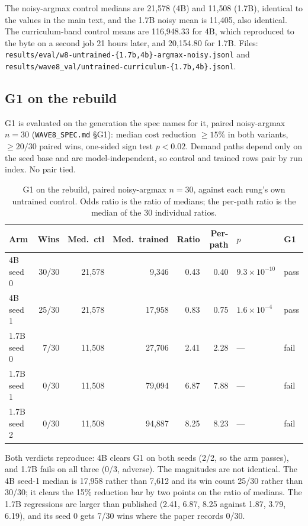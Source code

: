 \documentclass[11pt,a4paper]{article}
\begin{document}
The noisy-argmax control medians are 21{,}578 (4B) and 11{,}508 (1.7B), identical to the values in
the main text, and the 1.7B noisy mean is 11{,}405, also identical. The curriculum-band control means
are 116{,}948.33 for 4B, which reproduced to the byte on a second job 21 hours later, and 20{,}154.80
for 1.7B. Files: \texttt{results/eval/w8-untrained-\{1.7b,4b\}-argmax-noisy.jsonl} and
\texttt{results/wave8\_val/untrained-curriculum-\{1.7b,4b\}.jsonl}.

\subsection*{G1 on the rebuild}

G1 is evaluated on the generation the spec names for it, paired noisy-argmax $n{=}30$
(\texttt{WAVE8\_SPEC.md} \S G1): median cost reduction $\geq 15\%$ in both variants, $\geq 20/30$
paired wins, one-sided sign test $p<0.02$. Demand paths depend only on the seed base and are
model-independent, so control and trained rows pair by run index. No pair tied.

\begin{table}[h]
\centering
\small
\caption{G1 on the rebuild, paired noisy-argmax $n{=}30$, against each rung's own untrained control.
Odds ratio is the ratio of medians; the per-path ratio is the median of the 30 individual ratios.}
\label{tab:s6a}
\begin{tabular}{@{}lrrrrrll@{}}
\toprule
\textbf{Arm} & \textbf{Wins} & \textbf{Med.\ ctl} & \textbf{Med.\ trained} & \textbf{Ratio} & \textbf{Per-path} & \textbf{$p$} & \textbf{G1} \\
\midrule
4B seed 0 & 30/30 & 21{,}578 & 9{,}346 & 0.43 & 0.40 & $9.3\times10^{-10}$ & pass \\
4B seed 1 & 25/30 & 21{,}578 & 17{,}958 & 0.83 & 0.75 & $1.6\times10^{-4}$ & pass \\
\midrule
1.7B seed 0 & 7/30 & 11{,}508 & 27{,}706 & 2.41 & 2.28 & --- & fail \\
1.7B seed 1 & 0/30 & 11{,}508 & 79{,}094 & 6.87 & 7.88 & --- & fail \\
1.7B seed 2 & 0/30 & 11{,}508 & 94{,}887 & 8.25 & 8.23 & --- & fail \\
\bottomrule
\end{tabular}
\end{table}

Both verdicts reproduce: 4B clears G1 on both seeds (2/2, so the arm passes), and 1.7B fails on all
three (0/3, adverse). The magnitudes are not identical. The 4B seed-1 median is 17{,}958 rather than
7{,}612 and its win count 25/30 rather than 30/30; it clears the 15\% reduction bar by two points on
the ratio of medians. The 1.7B regressions are larger than published (2.41, 6.87, 8.25 against 1.87,
3.79, 6.19), and its seed 0 gets 7/30 wins where the paper records 0/30.
\end{document}
